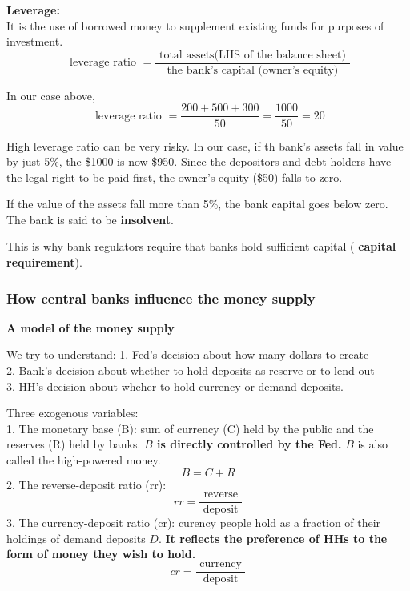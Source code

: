 \documentclass[12pt]{article}
\begin{document}
{\textbf {Leverage:}}\\
It is the use of borrowed money to supplement existing funds for purposes of 
investment.
\begin{equation*}
		\text{ leverage ratio } = \frac{\text{ total assets(LHS of the balance sheet) }}
		{\text{ the bank's capital (owner's equity) }}
\end{equation*}

In our case above, 
\begin{equation*}
\text{ leverage ratio } = \frac{200+500+300}{50} = \frac{1000}{50} = 20
\end{equation*}


High leverage ratio can be very risky. In our case, if th bank's assets fall in value
by just 5\%, the \$1000 is now \$950. Since the depositors and debt holders have the
legal right to be paid first, the owner's equity (\$50) falls to zero.

If the value of the assets fall more than 5\%, the bank capital goes below zero.
The bank is said to be {\textbf {insolvent}}.

This is why bank regulators require that banks hold sufficient capital (
{\textbf {capital requirement}}).



\subsubsection{How central banks influence the money supply}

{\textbf {A model of the money supply}}

We try to understand:
1. Fed's decision about how many dollars to create\\
2. Bank's decision about whether to hold deposits as reserve or to lend out\\
3. HH's decision about wheher to hold currency or demand deposits.


Three exogenous variables:\\
1. The monetary base (B):  sum of currency (C) held by the public and
the reserves (R) held by banks. {\textbf {$ B $ is directly controlled by the Fed.}}
$ B $ is also called the high-powered money.
\begin{equation*}
 B = C + R 
\end{equation*}
2. The reverse-deposit ratio (rr):
\begin{equation*}
rr = \frac{\text{ reverse }}{\text{ deposit }}
\end{equation*}
3. The currency-deposit ratio (cr): curency people hold as a fraction of their holdings
of demand deposits $ D $. {\textbf {It reflects the preference of HHs to the form
of money they wish to hold.}}
\begin{equation*}
cr = \frac{\text{ currency }}{\text{ deposit }}
\end{equation*}
\end{document}
